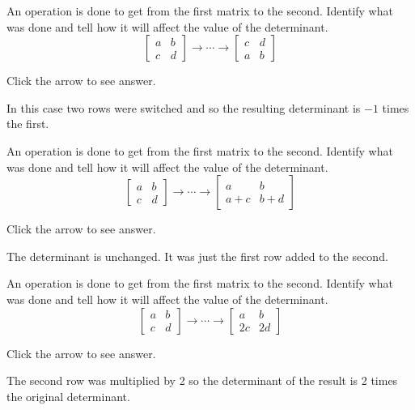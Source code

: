 \documentclass{ximera}
\begin{document}
\begin{problem}\label{prb:7.10} An operation is done to get from the first matrix to the second.
Identify what was done and tell how it will affect the value of the
determinant.
\begin{equation*}
\left[
\begin{array}{cc}
a & b \\
c & d
\end{array}
\right] \rightarrow \cdots \rightarrow \left[
\begin{array}{cc}
c & d \\
a & b
\end{array}
\right]
\end{equation*}

Click the arrow to see answer.
\begin{expandable}{}{}
In this case two rows were switched and so the resulting determinant is $-1$
times the first.
\end{expandable}
\end{problem}


\begin{problem}\label{prb:7.11} An operation is done to get from the first matrix to the second.
Identify what was done and tell how it will affect the value of the
determinant.
\begin{equation*}
\left[
\begin{array}{cc}
a & b \\
c & d
\end{array}
\right] \rightarrow \cdots \rightarrow \left[
\begin{array}{cc}
a & b \\
a+c & b+d
\end{array}
\right]
\end{equation*}

Click the arrow to see answer.
\begin{expandable}{}{}
The determinant is unchanged. It was just the first row added to the second.
\end{expandable}
\end{problem}


\begin{problem}\label{prb:7.12} An operation is done to get from the first matrix to the second.
Identify what was done and tell how it will affect the value of the
determinant.
\begin{equation*}
\left[
\begin{array}{cc}
a & b \\
c & d
\end{array}
\right] \rightarrow \cdots \rightarrow \left[
\begin{array}{cc}
a & b \\
2c & 2d
\end{array}
\right]
\end{equation*}

Click the arrow to see answer.
\begin{expandable}{}{}
The second row was multiplied by 2 so the determinant of the result is 2
times the original determinant.
\end{expandable}
\end{problem}
\end{document}
